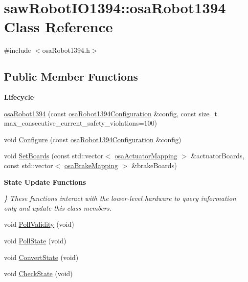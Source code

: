 \hypertarget{classsaw_robot_i_o1394_1_1osa_robot1394}{}\section{saw\+Robot\+I\+O1394\+:\+:osa\+Robot1394 Class Reference}
\label{classsaw_robot_i_o1394_1_1osa_robot1394}


{\ttfamily \#include $<$osa\+Robot1394.\+h$>$}

\subsection*{Public Member Functions}
\begin{Indent}{\bf Lifecycle}\par
\begin{DoxyCompactItemize}
\item 
\hyperlink{classsaw_robot_i_o1394_1_1osa_robot1394_a64823709982373c4e12b195dc8e3550a}{osa\+Robot1394} (const \hyperlink{structsaw_robot_i_o1394_1_1osa_robot1394_configuration}{osa\+Robot1394\+Configuration} \&config, const size\+\_\+t max\+\_\+consecutive\+\_\+current\+\_\+safety\+\_\+violations=100)
\item 
void \hyperlink{classsaw_robot_i_o1394_1_1osa_robot1394_a4015586b6aefc4e115efcd8c5a3ffdcf}{Configure} (const \hyperlink{structsaw_robot_i_o1394_1_1osa_robot1394_configuration}{osa\+Robot1394\+Configuration} \&config)
\item 
void \hyperlink{classsaw_robot_i_o1394_1_1osa_robot1394_ace9682c3c6c17de917b73b205168c431}{Set\+Boards} (const std\+::vector$<$ \hyperlink{structsaw_robot_i_o1394_1_1osa_actuator_mapping}{osa\+Actuator\+Mapping} $>$ \&actuator\+Boards, const std\+::vector$<$ \hyperlink{structsaw_robot_i_o1394_1_1osa_brake_mapping}{osa\+Brake\+Mapping} $>$ \&brake\+Boards)
\end{DoxyCompactItemize}
\end{Indent}
\begin{Indent}{\bf State Update Functions}\par
{\em \} These functions interact with the lower-\/level hardware to query information only and update this class\textquotesingle{} members. }\begin{DoxyCompactItemize}
\item 
void \hyperlink{classsaw_robot_i_o1394_1_1osa_robot1394_a01557c89c207af1bd203f2d890af5057}{Poll\+Validity} (void)
\item 
void \hyperlink{classsaw_robot_i_o1394_1_1osa_robot1394_ac57a268f5fd855fb58906514e3beb9cd}{Poll\+State} (void)
\item 
void \hyperlink{classsaw_robot_i_o1394_1_1osa_robot1394_a4dbd546337cf55fe1edd85451878f025}{Convert\+State} (void)
\item 
void \hyperlink{classsaw_robot_i_o1394_1_1osa_robot1394_a16946ac9eca7aecf40da51ac139f9346}{Check\+State} (void)
\end{DoxyCompactItemize}
\end{Indent}
